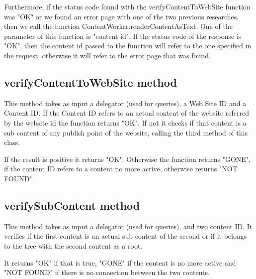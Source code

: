 Furthermore, if the status code found with the verifyContentToWebSite function was "OK" or we found an error page with one of the two previous researches, then we call the function ContentWorker.renderContentAsText.
One of the parameter of this function is "content id". If the status code of the response is "OK", then the content id passed to the function will refer to the one specified in the request, otherwise it will refer to the error page that was found.




\subsection{verifyContentToWebSite method}
This method takes as input a delegator (used for queries), a Web Site ID and a Content ID.
If the Content ID refers to an actual content of the website referred by the website id the function returns "OK".
If not it checks if that content is a sub content of any publish point of the website, calling the third method of this class.

If the result is positive it returns "OK". Otherwise the function returns "GONE", if the content ID refers to a content no more active, otherwise returns "NOT FOUND".

\subsection{verifySubContent method}
This method takes as input a delegator (used for queries), and two content ID.
It verifies if the first content is an actual sub content of the second or if it belongs to the tree with the second content as a root.

It returns "OK" if that is true, "GONE" if the content is no more active and "NOT FOUND" if there is no connection between the two contents.